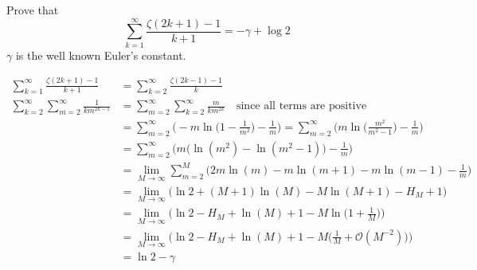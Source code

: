 \documentclass[color=green,titlestyle=hang]{elegantbook}%
\begin{document}
\begin{exercise}
Prove that \[\sum_{k=1}^\infty \frac{\zeta(2k+1)-1}{k+1}=-\gamma +\log 2\]
\(\gamma\) is the well known Euler's constant.
\end{exercise}\begin{newproof}
\begin{align*}
\sum_{k=1}^{\infty} \frac{\zeta(2k+1)-1}{k+1} &= \sum_{k=2}^{\infty} \frac{\zeta(2k-1)-1}{k}\\
\sum_{k=2}^{\infty} \sum_{m=2}^{\infty} \frac{1}{k m^{2k-1}} 
&= \sum_{m=2}^{\infty} \sum_{k=2}^{\infty} \frac{m}{km^{2k}} \quad\text{since all terms are positive}\\
& = \sum_{m=2}^{\infty} \Big( -m \ln \Big( 1- \frac{1}{m^{2}} \Big) - \frac{1}{m} \Big) = \sum_{m=2}^{\infty} \Big(m \ln \Big( \frac{m^{2}}{m^{2}-1} \Big) - \frac{1}{m} \Big)\\
&= \sum_{m=2}^{\infty} \Bigg( m \Big( \ln(m^{2}) - \ln(m^{2}-1) \Big) - \frac{1}{m} \Bigg)\\
&= \lim_{M \to \infty} \sum_{m=2}^{M} \Big( 2m \ln(m) - m \ln(m+1) - m \ln(m-1) - \frac{1}{m} \Big)\\
&= \lim_{M \to \infty} \Big( \ln 2 + (M+1) \ln(M) - M \ln(M+1) - H_{M}+1 \Big)\\
&= \lim_{M \to \infty} \Bigg( \ln 2 - H_{M} + \ln(M) +1 - M \ln \Big( 1 + \frac{1}{M} \Big) \Bigg)\\
& = \lim_{M \to \infty} \Bigg( \ln 2 - H_{M} + \ln(M) +1 - M \Big( \frac{1}{M} + \mathcal{O}(M^{-2}) \Big) \Bigg)\\
&= \ln 2 - \gamma
\end{align*}
\end{newproof}
\end{document}
